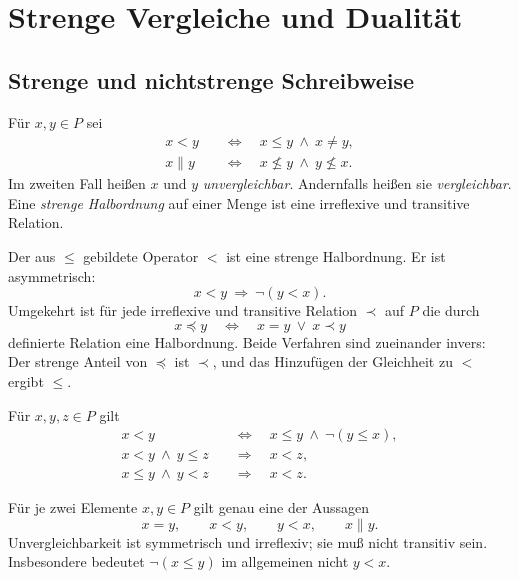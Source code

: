 \chapter{Strenge Vergleiche und Dualität}
\label{b12guide:ch:strict}

\section{Strenge und nichtstrenge Schreibweise}

\begin{definition}
\label{b12guide:def:strict}
Für $x,y\in P$ sei
\[
\begin{aligned}
 x<y&\quad\Longleftrightarrow\quad x\leq y\ \land\ x\ne y,\\
 x\parallel y&\quad\Longleftrightarrow\quad
                     x\nleq y\ \land\ y\nleq x.
\end{aligned}
\]
Im zweiten Fall heißen $x$ und $y$ \emph{unvergleichbar}.
Andernfalls heißen sie \emph{vergleichbar}.
Eine \emph{strenge Halbordnung} auf einer Menge ist eine
irreflexive und transitive Relation.
\end{definition}

\begin{theorem}
\label{b12guide:thm:strict-correspondence}
Der aus $\leq$ gebildete Operator $<$ ist eine strenge
Halbordnung. Er ist asymmetrisch:
\[
 x<y\ \Rightarrow\ \neg(y<x).
\]
Umgekehrt ist für jede irreflexive und transitive Relation $\prec$
auf $P$ die durch
\[
 x\preceq y\quad\Longleftrightarrow\quad x=y\ \lor\ x\prec y
\]
definierte Relation eine Halbordnung. Beide Verfahren sind
zueinander invers: Der strenge Anteil von $\preceq$ ist $\prec$,
und das Hinzufügen der Gleichheit zu $<$ ergibt $\leq$.
\end{theorem}

\begin{theorem}
\label{b12guide:thm:mixed}
Für $x,y,z\in P$ gilt
\[
\begin{aligned}
 x<y&\quad\Longleftrightarrow\quad x\leq y\ \land\ \neg(y\leq x),\\
 x<y\ \land\ y\leq z&\quad\Longrightarrow\quad x<z,\\
 x\leq y\ \land\ y<z&\quad\Longrightarrow\quad x<z.
\end{aligned}
\]
\end{theorem}

\begin{theorem}
\label{b12guide:thm:four-cases}
Für je zwei Elemente $x,y\in P$ gilt genau eine der Aussagen
\[
 x=y,\qquad x<y,\qquad y<x,\qquad x\parallel y.
\]
Unvergleichbarkeit ist symmetrisch und irreflexiv; sie muß nicht
transitiv sein. Insbesondere bedeutet $\neg(x\leq y)$ im
allgemeinen nicht $y<x$.
\end{theorem}

